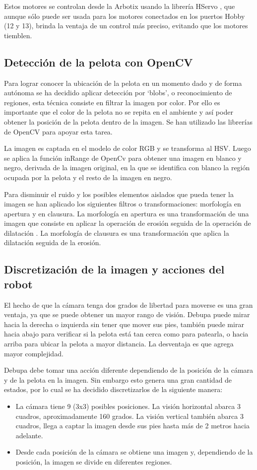 \documentclass[tikz,conference, letterpaper]{IEEEtranMC1}
\begin{document}
Estos motores se controlan desde la Arbotix usando la librería HServo \cite{vanadium}, que aunque sólo puede ser usada para los motores conectados en los puertos Hobby (12 y 13), brinda la ventaja de un control más preciso, evitando que los motores tiemblen. 
 

\subsection{Detección de la pelota con OpenCV}
Para lograr conocer la ubicación de la pelota en un momento dado y de forma autónoma se ha decidido aplicar detección por ‘blobs’, o reconocimiento de regiones, esta técnica consiste en filtrar la imagen por color. Por ello es importante que el color de la pelota no se repita en el ambiente y así poder obtener la posición de la pelota dentro de la imagen. Se han utilizado las librerías de OpenCV para apoyar esta tarea.

La imagen es captada en el modelo de color RGB y se transforma al HSV. Luego se aplica
la función inRange de OpenCv para obtener una imagen en blanco y negro, derivada de la imagen original, en la que se identifica con blanco la región ocupada por la pelota y el resto de la imagen en negro. 

Para disminuir el ruido y los posibles elementos aislados que pueda tener la imagen se han aplicado los siguientes filtros o transformaciones: morfología en apertura y en clausura. La morfología en apertura es una transformación de una imagen que consiste en aplicar la operación de erosión seguida de la operación de dilatación \cite{filtros}. La morfología de clausura es una transformación que aplica la dilatación seguida de la erosión.


\subsection{Discretización de la imagen y acciones del robot}

El hecho de  que la cámara tenga dos grados de libertad para moverse es una gran ventaja, ya que se puede obtener un mayor rango de visión. Debupa puede mirar hacia la derecha o izquierda sin tener que mover sus pies, también puede mirar hacia abajo para verificar si la pelota está tan cerca como para patearla, o hacia arriba para ubicar la pelota a mayor distancia. La desventaja es que agrega mayor complejidad.

Debupa debe tomar una acción diferente dependiendo de la posición de la cámara y de la pelota en la imagen. Sin embargo esto genera una gran cantidad de estados, por lo cual se ha decidido discretizarlos de la siguiente manera:  
\begin{itemize}
\item La cámara tiene 9  (3x3) posibles posiciones. La visión horizontal abarca 3 cuadros, aproximadamente 160 grados. La visión vertical también abarca 3 cuadros, llega a captar la imagen desde sus pies hasta más de 2 metros hacia adelante.
\item Desde cada posición de la cámara se obtiene una imagen y, dependiendo de la posición, la imagen se divide en diferentes regiones. 
\end{itemize}
 
\end{document}
